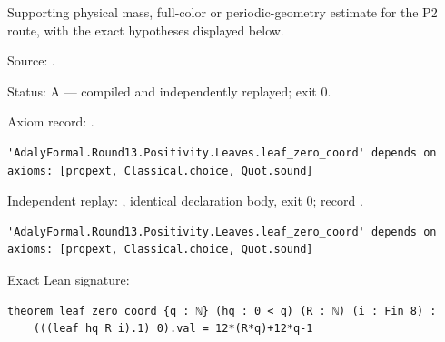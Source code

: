 \begin{theorem}[bp-440]
\label{bp-440}
\uses{}
\leanok
Supporting physical mass, full-color or periodic-geometry estimate for the P2 route, with the exact hypotheses displayed below.

\par Source: \texttt{}.
\par Status: A — compiled and independently replayed; exit 0.
\par Axiom record: \texttt{}.
\begin{verbatim}
'AdalyFormal.Round13.Positivity.Leaves.leaf_zero_coord' depends on axioms: [propext, Classical.choice, Quot.sound]
\end{verbatim}
\par Independent replay: \texttt{}, identical declaration body, exit 0; record \texttt{}.
\begin{verbatim}
'AdalyFormal.Round13.Positivity.Leaves.leaf_zero_coord' depends on axioms: [propext, Classical.choice, Quot.sound]
\end{verbatim}
\par Exact Lean signature:
\begin{verbatim}
theorem leaf_zero_coord {q : ℕ} (hq : 0 < q) (R : ℕ) (i : Fin 8) :
    (((leaf hq R i).1) 0).val = 12*(R*q)+12*q-1
\end{verbatim}
\end{theorem}

